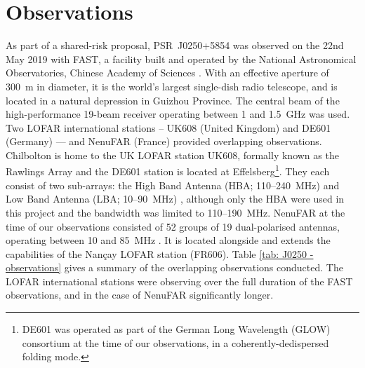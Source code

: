 \section{Observations}
\label{sec: J0250 - observations}

As part of a shared-risk proposal, PSR~J0250+5854 was observed on the 22nd May 2019 with FAST, a facility built and operated by the National Astronomical Observatories, Chinese Academy of Sciences \citep{NLJ+2011,LWQ+2018}. With an effective aperture of 300~m in diameter, it is the world's largest single-dish radio telescope, and is located in a natural depression in Guizhou Province. The central beam of the high-performance 19-beam receiver operating between 1 and 1.5~GHz \citep{JTH+2020} was used. Two LOFAR international stations -- UK608 (United Kingdom) and DE601 (Germany) --- and NenuFAR (France) provided overlapping observations. Chilbolton is home to the UK LOFAR station UK608, formally known as the Rawlings Array and the DE601 station is located at Effelsberg\footnote{DE601 was operated as part of the German Long Wavelength (GLOW) consortium at the time of our observations, in a coherently-dedispersed folding mode.}. They each consist of two sub-arrays: the High Band Antenna (HBA; 110--240~MHz) and Low Band Antenna (LBA; 10--90~MHz) \citep{HWG+2013,SHA+2011}, although only the HBA were used in this project and the bandwidth was limited to 110--190~MHz. NenuFAR at the time of our observations consisted of 52 groups of 19 dual-polarised antennas, operating between 10 and 85~MHz \citep{ZDT+2020}. It is located alongside and extends the capabilities of the Nan\c{c}ay LOFAR station (FR606). Table \ref{tab: J0250 - observations} gives a summary of the overlapping observations conducted. The LOFAR international stations were observing over the full duration of the FAST observations, and in the case of NenuFAR significantly longer.

